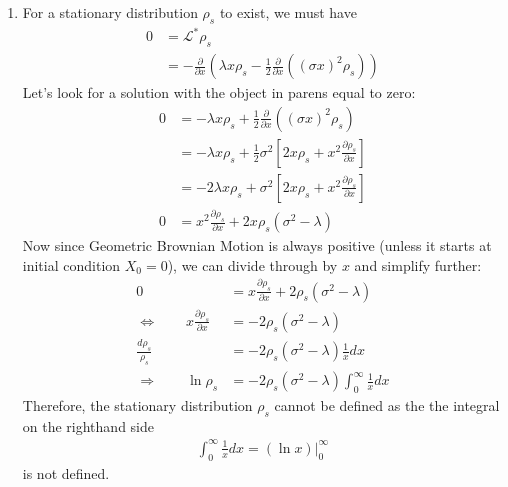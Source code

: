 \documentclass[12pt]{article}
\theoremstyle{plain}
\theoremstyle{definition}
\theoremstyle{remark}
\begin{document}
\begin{enumerate}
\begin{enumerate}
      \item %
        For a stationary distribution $\rho_s$ to exist, we must have
        \begin{align*}
          0 &= \mathscr{L}^*\rho_s\\
          &= -\frac{\partial}{\partial x}
            \left(
            \lambda x \rho_s - \frac{1}{2}
            \frac{\partial}{\partial x}\left((\sigma x)^2\rho_s\right)
            \right)
        \end{align*}
        Let's look for a solution with the object in parens equal to
        zero:
        \begin{align*}
          0
          &=
          - \lambda x \rho_s + \frac{1}{2}
            \frac{\partial}{\partial x}\left((\sigma x)^2\rho_s\right)\\
          &=
          - \lambda x \rho_s + \frac{1}{2}
            \sigma^2 \left[
              2x\rho_s + x^2\frac{\partial \rho_s}{\partial x}
            \right]\\
          &=
          - 2\lambda x \rho_s +
            \sigma^2 \left[
              2x\rho_s + x^2\frac{\partial \rho_s}{\partial x}
            \right]\\
          0 &=
            x^2\frac{\partial \rho_s}{\partial x}
            + 2x\rho_s (\sigma^2 -\lambda)
        \end{align*}
        Now since Geometric Brownian Motion is always positive (unless
        it starts at initial condition $X_0=0$), we can divide through
        by $x$ and simplify further:
        \begin{align*}
          0 &=
            x\frac{\partial \rho_s}{\partial x}
            + 2\rho_s (\sigma^2 -\lambda) \\
          \Leftrightarrow\qquad
            x\frac{\partial \rho_s}{\partial x}
            &=
            - 2\rho_s (\sigma^2 -\lambda) \\
            \frac{d \rho_s}{\rho_s}
            &=
            - 2\rho_s (\sigma^2 -\lambda) \frac{1}{x} dx\\
          \Rightarrow\qquad
            \ln\rho_s
            &=
            - 2\rho_s (\sigma^2 -\lambda) \int^\infty_0 \frac{1}{x} dx
        \end{align*}
        Therefore, the stationary distribution $\rho_s$ cannot be
        defined as the the integral on the righthand side
        \begin{align*}
          \int^\infty_0 \frac{1}{x} dx = (\ln x)|^\infty_0
        \end{align*}
        is not defined.


\end{enumerate}
\end{enumerate}
\end{document}
